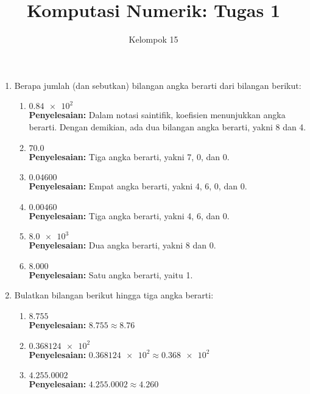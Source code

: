\documentclass{article}
\title{\textbf{Komputasi Numerik: Tugas 1}}
\author{Kelompok 15}
\date{}
\newcommand{\penyelesaian}{\textbf{Penyelesaian: }}
\begin{document}
\maketitle

\begin{enumerate}
    \item Berapa jumlah (dan sebutkan) bilangan angka berarti dari bilangan berikut:
    \begin{enumerate}
        \item $\num{0,84e2}$ \\
        \penyelesaian Dalam notasi saintifik, koefisien menunjukkan angka berarti.
        Dengan demikian, ada dua bilangan angka berarti, yakni 8 dan 4.

        \item $\num{70,0}$ \\
        \penyelesaian Tiga angka berarti, yakni 7, 0, dan 0.

        \item $\num{0,04600}$ \\
        \penyelesaian Empat angka berarti, yakni 4, 6, 0, dan 0.
        
        \item $\num{0,00460}$ \\
        \penyelesaian Tiga angka berarti, yakni 4, 6, dan 0.

        \item $\num{8,0e3}$ \\
        \penyelesaian Dua angka berarti, yakni 8 dan 0.
        
        \item $\num{8.000}$ \\
        \penyelesaian Satu angka berarti, yaitu 1.
    \end{enumerate}

    \item Bulatkan bilangan berikut hingga tiga angka berarti:
    \begin{enumerate}
        \item $\num{8.755}$ \\ 
        \penyelesaian $\num{8.755} \approx \num{8.76}$

        \item $\num{0,368124e2}$ \\
        \penyelesaian $\num{0,368124e2} \approx \num{0,368e2}$

        \item $\num{4.255,0002}$ \\
        \penyelesaian $\num{4.255,0002} \approx \num{4.260}$


\end{enumerate}
\end{enumerate}
\end{document}
